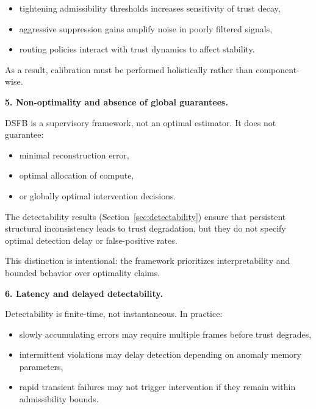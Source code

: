 \documentclass[11pt,letterpaper]{article}
\theoremstyle{gcresult}
\theoremstyle{definition}
\begin{document}
\begin{itemize}[leftmargin=1.5em]
    \item tightening admissibility thresholds increases sensitivity of trust decay,
    \item aggressive suppression gains amplify noise in poorly filtered signals,
    \item routing policies interact with trust dynamics to affect stability.
\end{itemize}

As a result, calibration must be performed holistically rather than component-wise.

\vspace{0.5em}
\noindent
\textbf{5. Non-optimality and absence of global guarantees.}

DSFB is a supervisory framework, not an optimal estimator. It does not guarantee:

\begin{itemize}[leftmargin=1.5em]
    \item minimal reconstruction error,
    \item optimal allocation of compute,
    \item or globally optimal intervention decisions.
\end{itemize}

The detectability results (Section~\ref{sec:detectability}) ensure that persistent structural inconsistency leads to trust degradation, but they do not specify optimal detection delay or false-positive rates.

This distinction is intentional: the framework prioritizes interpretability and bounded behavior over optimality claims.

\vspace{0.5em}
\noindent
\textbf{6. Latency and delayed detectability.}

Detectability is finite-time, not instantaneous. In practice:

\begin{itemize}[leftmargin=1.5em]
    \item slowly accumulating errors may require multiple frames before trust degrades,
    \item intermittent violations may delay detection depending on anomaly memory parameters,
    \item rapid transient failures may not trigger intervention if they remain within admissibility bounds.
\end{itemize}
\end{document}
